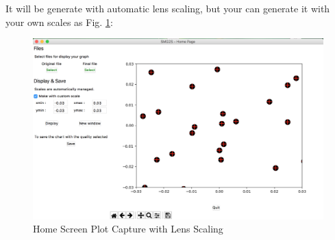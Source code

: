 \documentclass[a4paper, 10 pt]{report}
\begin{document}
It will be generate with automatic lens scaling, but your can generate it with your own scales as Fig. \ref{fig:Home Screen Plot Capture with lens scaling}:

\begin{figure}[htbp]
	\label{fig:Home Screen Plot Capture with lens scaling}
	\caption{Home Screen Plot Capture with Lens Scaling}
		\centering
	\includegraphics[width=12cm]{home_screen_custom.png}
\end{figure}

	\newpage
	
	
	
	
\end{document}
